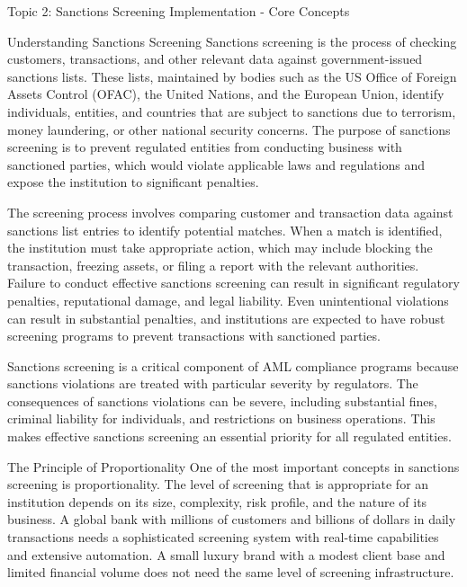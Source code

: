 \documentclass[5pt]{beamer}
\begin{document}
	\begin{frame}{Topic 2: Sanctions Screening Implementation - Core Concepts}
		\begin{block}{\tiny Understanding Sanctions Screening}
			\tiny Sanctions screening is the process of checking customers, transactions, and other relevant data against government-issued sanctions lists. These lists, maintained by bodies such as the US Office of Foreign Assets Control (OFAC), the United Nations, and the European Union, identify individuals, entities, and countries that are subject to sanctions due to terrorism, money laundering, or other national security concerns. The purpose of sanctions screening is to prevent regulated entities from conducting business with sanctioned parties, which would violate applicable laws and regulations and expose the institution to significant penalties.
			
			The screening process involves comparing customer and transaction data against sanctions list entries to identify potential matches. When a match is identified, the institution must take appropriate action, which may include blocking the transaction, freezing assets, or filing a report with the relevant authorities. Failure to conduct effective sanctions screening can result in significant regulatory penalties, reputational damage, and legal liability. Even unintentional violations can result in substantial penalties, and institutions are expected to have robust screening programs to prevent transactions with sanctioned parties.
			
			Sanctions screening is a critical component of AML compliance programs because sanctions violations are treated with particular severity by regulators. The consequences of sanctions violations can be severe, including substantial fines, criminal liability for individuals, and restrictions on business operations. This makes effective sanctions screening an essential priority for all regulated entities.
		\end{block}
		
		\begin{block}{\tiny The Principle of Proportionality}
			\tiny One of the most important concepts in sanctions screening is proportionality. The level of screening that is appropriate for an institution depends on its size, complexity, risk profile, and the nature of its business. A global bank with millions of customers and billions of dollars in daily transactions needs a sophisticated screening system with real-time capabilities and extensive automation. A small luxury brand with a modest client base and limited financial volume does not need the same level of screening infrastructure.
			

\end{block}
\end{frame}
\end{document}
